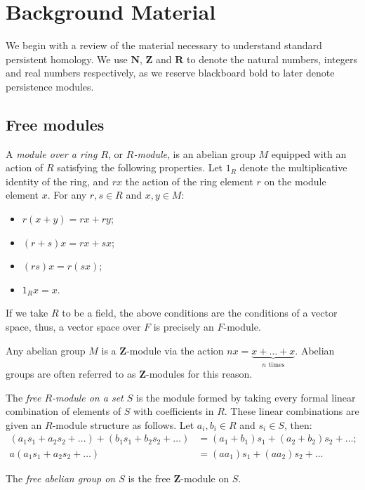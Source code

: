 \section{Background Material}

We begin with a review of the material necessary to understand standard persistent homology. We use $\mathbf{N}$, $\mathbf{Z}$ and $\mathbf{R}$ to denote the natural numbers, integers and real numbers respectively, as we reserve blackboard bold to later denote persistence modules.

\subsection{Free modules}

\begin{definition}
A \emph{module over a ring $R$}, or \emph{$R$-module}, is an abelian group $M$ equipped with an action of $R$ satisfying the following properties. Let $1_R$ denote the multiplicative identity of the ring, and $rx$ the action of the ring element $r$ on the module element $x$. For any $r, s \in R$ and $x, y \in M$:
\begin{itemize}
\itemsep0em
\item $r(x + y) = rx + ry$;
\item $(r + s)x = rx + sx$;
\item $(rs)x = r(sx)$;
\item $1_R x = x$.
\end{itemize}
\end{definition}

\begin{example}
If we take $R$ to be a field, the above conditions are the conditions of a vector space, thus, a vector space over $F$ is precisely an $F$-module.
\end{example}

\begin{example}
Any abelian group $M$ is a $\mathbf{Z}$-module via the action $nx = \underbrace{x + \dots + x}_{n \text{ times}}$. Abelian groups are often referred to as $\mathbf{Z}$-modules for this reason.
\end{example}

\begin{definition}
The \emph{free $R$-module on a set $S$} is the module formed by taking every formal linear combination of elements of $S$ with coefficients in $R$. These linear combinations are given an $R$-module structure as follows. Let $a_i, b_i \in R$ and $s_i \in S$, then:
\begin{align*}
(a_1 s_1 + a_2 s_2 + \dots) + (b_1 s_1 + b_2 s_2 + \dots) &= (a_1 + b_1) s_1 + (a_2 + b_2) s_2 + \dots; \\
a (a_1 s_1 + a_2 s_2 + \dots) &= (a a_1) s_1 + (a a_2) s_2 + \dots
\end{align*}

The \emph{free abelian group on $S$} is the free $\mathbf{Z}$-module on $S$.
\end{definition}


